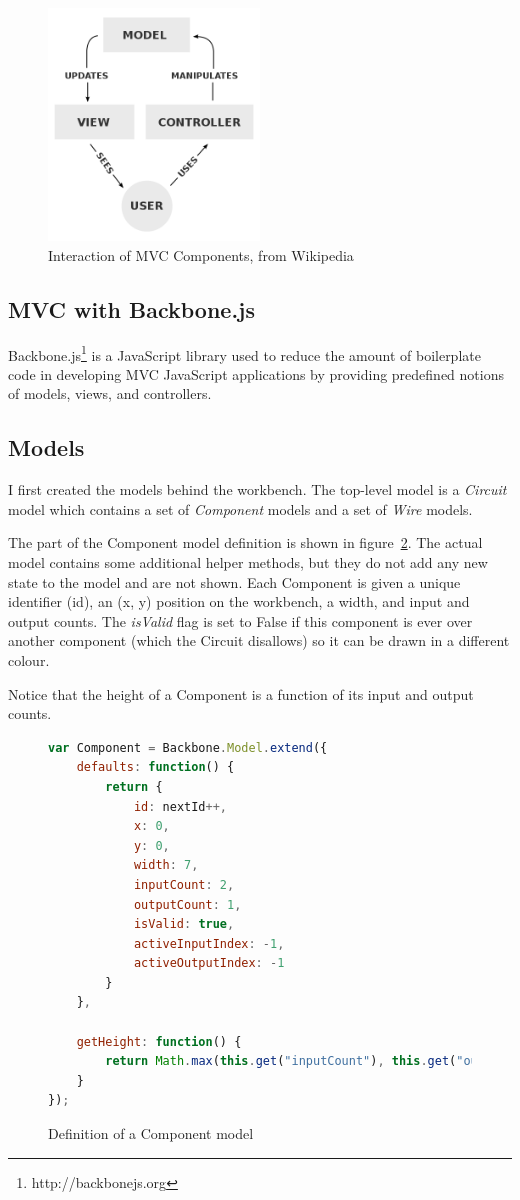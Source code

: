 \begin{figure}[H]
	\centering
	\includegraphics[width=0.5\textwidth]{mvc.png}
	\caption{Interaction of MVC Components, from Wikipedia\cite{Wikipedia: MVC Image}}
	\label{fig:mvc}
\end{figure}

\subsection{MVC with Backbone.js}
Backbone.js\footnote{http://backbonejs.org} is a JavaScript library used to reduce the amount of boilerplate code in developing MVC JavaScript applications by providing predefined notions of models, views, and controllers.

\subsection{Models}
I first created the models behind the workbench. The top-level model is a \textit{Circuit} model which contains a set of \textit{Component} models and a set of \textit{Wire} models.

The part of the Component model definition is shown in figure~\ref{fig:componentmodel}. The actual model contains some additional helper methods, but they do not add any new state to the model and are not shown. Each Component is given a unique identifier (id), an (x, y) position on the workbench, a width, and input and output counts. The \textit{isValid} flag is set to False if this component is ever over another component (which the Circuit disallows) so it can be drawn in a different colour.

Notice that the height of a Component is a function of its input and output counts.

\begin{figure}
\begin{lstlisting}[language=JavaScript]
var Component = Backbone.Model.extend({
	defaults: function() {
    	return {
        	id: nextId++,
            x: 0,
            y: 0,
            width: 7,
            inputCount: 2,
            outputCount: 1,
            isValid: true,
            activeInputIndex: -1,
            activeOutputIndex: -1
        }
    },

    getHeight: function() {
        return Math.max(this.get("inputCount"), this.get("outputCount")) * 2 + 1;
    }
});
\end{lstlisting}
\caption{Definition of a Component model}
\label{fig:componentmodel}
\end{figure}


